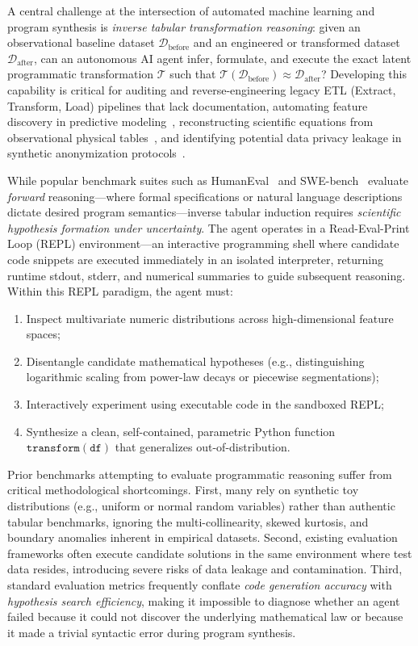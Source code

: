 \documentclass[sigconf]{acmart}
\begin{document}
A central challenge at the intersection of automated machine learning and program synthesis is \emph{inverse tabular transformation reasoning}: given an observational baseline dataset $\mathcal{D}_{\text{before}}$ and an engineered or transformed dataset $\mathcal{D}_{\text{after}}$, can an autonomous AI agent infer, formulate, and execute the exact latent programmatic transformation $\mathcal{T}$ such that $\mathcal{T}(\mathcal{D}_{\text{before}}) \approx \mathcal{D}_{\text{after}}$? Developing this capability is critical for auditing and reverse-engineering legacy ETL (Extract, Transform, Load) pipelines that lack documentation, automating feature discovery in predictive modeling~\cite{cranmer2020frontier}, reconstructing scientific equations from observational physical tables~\cite{schmidt2009distilling,udrescu2020ai}, and identifying potential data privacy leakage in synthetic anonymization protocols~\cite{stadler2022synthetic}.

While popular benchmark suites such as HumanEval~\cite{chen2021evaluating} and SWE-bench~\cite{jimenez2024swebench} evaluate \emph{forward} reasoning—where formal specifications or natural language descriptions dictate desired program semantics—inverse tabular induction requires \emph{scientific hypothesis formation under uncertainty}. The agent operates in a Read-Eval-Print Loop (REPL) environment—an interactive programming shell where candidate code snippets are executed immediately in an isolated interpreter, returning runtime stdout, stderr, and numerical summaries to guide subsequent reasoning. Within this REPL paradigm, the agent must:
\begin{enumerate}
    \item Inspect multivariate numeric distributions across high-dimensional feature spaces;
    \item Disentangle candidate mathematical hypotheses (e.g., distinguishing logarithmic scaling from power-law decays or piecewise segmentations);
    \item Interactively experiment using executable code in the sandboxed REPL;
    \item Synthesize a clean, self-contained, parametric Python function $\texttt{transform}(\texttt{df})$ that generalizes out-of-distribution.
\end{enumerate}

Prior benchmarks attempting to evaluate programmatic reasoning suffer from critical methodological shortcomings. First, many rely on synthetic toy distributions (e.g., uniform or normal random variables) rather than authentic tabular benchmarks, ignoring the multi-collinearity, skewed kurtosis, and boundary anomalies inherent in empirical datasets. Second, existing evaluation frameworks often execute candidate solutions in the same environment where test data resides, introducing severe risks of data leakage and contamination. Third, standard evaluation metrics frequently conflate \emph{code generation accuracy} with \emph{hypothesis search efficiency}, making it impossible to diagnose whether an agent failed because it could not discover the underlying mathematical law or because it made a trivial syntactic error during program synthesis.
\end{document}
